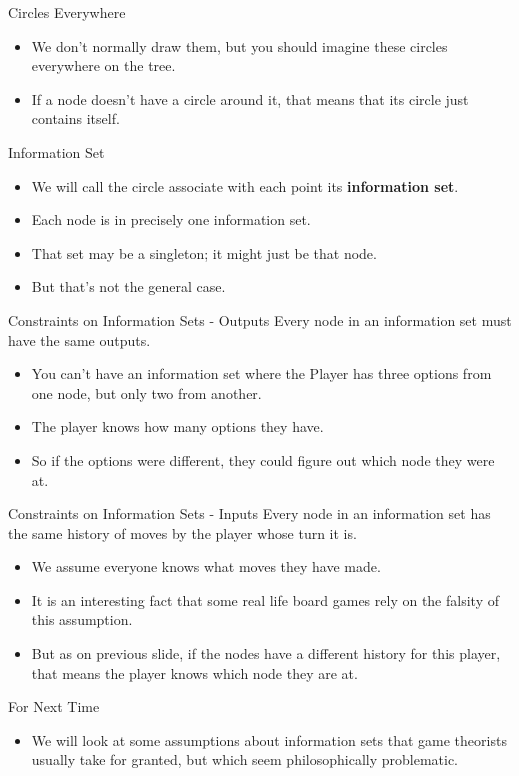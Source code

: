 \documentclass[
  ignorenonframetext,
]{beamer}
\providecommand{\tightlist}{%
  \setlength{\itemsep}{0pt}\setlength{\parskip}{0pt}}
\begin{document}
\begin{frame}{Circles Everywhere}
\protect\hypertarget{circles-everywhere}{}
\begin{itemize}
\tightlist
\item
  We don't normally draw them, but you should imagine these circles
  everywhere on the tree.
\item
  If a node doesn't have a circle around it, that means that its circle
  just contains itself.
\end{itemize}
\end{frame}

\begin{frame}{Information Set}
\protect\hypertarget{information-set}{}
\begin{itemize}
\tightlist
\item
  We will call the circle associate with each point its
  \textbf{information set}.
\item
  Each node is in precisely one information set.
\item
  That set may be a singleton; it might just be that node.
\item
  But that's not the general case.
\end{itemize}
\end{frame}

\begin{frame}{Constraints on Information Sets - Outputs}
\protect\hypertarget{constraints-on-information-sets---outputs}{}
Every node in an information set must have the same outputs.

\begin{itemize}
\tightlist
\item
  You can't have an information set where the Player has three options
  from one node, but only two from another.
\item
  The player knows how many options they have.
\item
  So if the options were different, they could figure out which node
  they were at.
\end{itemize}
\end{frame}

\begin{frame}{Constraints on Information Sets - Inputs}
\protect\hypertarget{constraints-on-information-sets---inputs}{}
Every node in an information set has the same history of moves by the
player whose turn it is.

\begin{itemize}
\tightlist
\item
  We assume everyone knows what moves they have made.
\item
  It is an interesting fact that some real life board games rely on the
  falsity of this assumption.
\item
  But as on previous slide, if the nodes have a different history for
  this player, that means the player knows which node they are at.
\end{itemize}
\end{frame}

\begin{frame}{For Next Time}
\protect\hypertarget{for-next-time}{}
\begin{itemize}
\tightlist
\item
  We will look at some assumptions about information sets that game
  theorists usually take for granted, but which seem philosophically
  problematic.
\end{itemize}
\end{frame}
\end{document}
